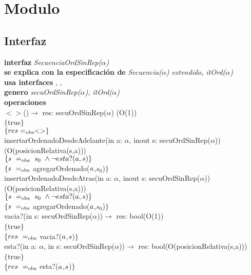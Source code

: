 \section*{Modulo }

\subsection*{Interfaz}
\textbf{interfaz} \textit{SecuenciaOrdSinRep($\alpha$)}\\
\textbf{se explica con la especificaci\'on de} \textit{Secuencia($\alpha$) extendido, itOrd($\alpha$)}\\
\textbf{usa interfaces} , \nombretad{$\alpha$}, \\
\textbf{genero} \textit{secuOrdSinRep($\alpha$), itOrd($\alpha$)}\\

\textbf{operaciones}\\

$<>$()$\longrightarrow$ res: secuOrdSinRep($\alpha$) \hfill (O(1))\\
$\{$true$\}$\\
$\{{res} =_{\mathrm{obs}} <> \}$\\

insertarOrdenadoDesdeAdelante(in a: $\alpha$, inout s: secuOrdSinRep($\alpha$)) \hfill (O(posicionRelativa(s,a)))\\
$\{{s}\ =_{\mathrm{obs}}\ s_0\ \wedge \neg esta?(a,s) \}$\\
$\{{s}\ =_{\mathrm{obs}}$ agregarOrdenado(${a}$,$s_0$)$\}$\\

insertarOrdenadoDesdeAtras(in a: $\alpha$, inout s: secuOrdSinRep($\alpha$)) \hfill (O(posicionRelativa(s,a)))\\
$\{{s}\ =_{\mathrm{obs}}\ s_0\ \wedge \neg esta?(a,s) \}$\\
$\{{s}\ =_{\mathrm{obs}}$ agregarOrdenado(${a}$,$s_0$)$\}$\\

vacia?(in s: secuOrdSinRep($\alpha$))$\longrightarrow$ res: bool\hfill (O(1))\\
$\{$true$\}$\\
$\{{res}\ =_{\mathrm{obs}}$ vacia?(${a}$,${s}$)$\}$\\

esta?(in a: $\alpha$, in s: secuOrdSinRep($\alpha$))$\longrightarrow$ res: bool\hfill (O(posicionRelativa(s,a)))\\
$\{$true$\}$\\
$\{{res}\ =_{\mathrm{obs}}$ esta?(${a}$,${s}$)$\}$\\

